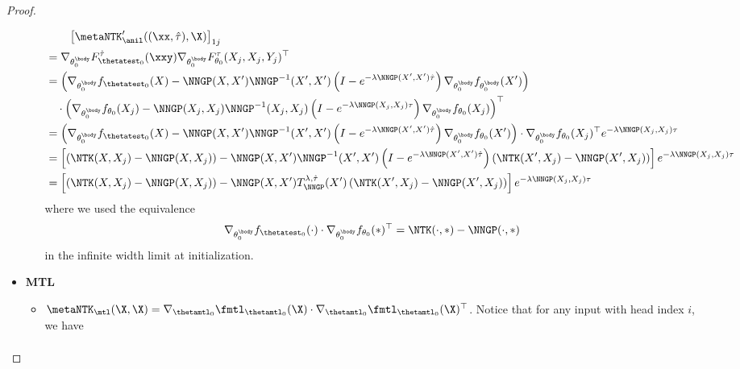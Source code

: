 \documentclass{article}
\begin{document}
\begin{proof}
\begin{itemize}[leftmargin=*,align=left,noitemsep,nolistsep]
\begin{itemize}[leftmargin=*,align=left,noitemsep,nolistsep]
        \begin{align}
            &\qquad\left[\metaNTK_\anil'((\xx,\hat\tau),\X)\right]_{1j}\nonumber \\
            &=  \nabla_{\theta_0^\body}F^{\hat\tau}_{\thetatest_0}(\xxy) \nabla_{\theta_0^\body}F^{\tau}_{\theta_0}(X_j,X_j,Y_j)^\top\nonumber\\
            &=\left(\nabla_{\theta_0^\body} f_{\thetatest_0}(X) - \NNGP(X,X')\NNGP^{-1}(X',X')\left(I - e^{-\lambda \NNGP(X',X')\hat\tau}\right) \nabla_{\theta_0^\body} f_{\theta_0^\body}(X') \right) \nonumber\\
            &\quad\cdot \left(\nabla_{\theta_0^\body} f_{\theta_0}(X_j) - \NNGP(X_j,X_j)\NNGP^{-1}(X_j,X_j)\left(I - e^{-\lambda \NNGP(X_j,X_j)\tau}\right) \nabla_{\theta_0^\body} f_{\theta_0}(X_j) \right)^\top\nonumber\\
            &= \left(\nabla_{\theta_0^\body} f_{\thetatest_0}(X) - \NNGP(X,X')\NNGP^{-1}(X',X')\left(I - e^{-\lambda \NNGP(X',X')\hat\tau}\right) \nabla_{\theta_0^\body} f_{\theta_0}(X') \right) \cdot \nabla_{\theta_0^\body} f_{\theta_0}(X_j)^\top e^{-\lambda \NNGP(X_j,X_j)\tau} \nonumber \\
            &= \left[\left(\NTK(X,X_j) -\NNGP(X,X_j)\right)- \NNGP(X,X')\NNGP^{-1}(X',X')\left(I - e^{-\lambda \NNGP(X',X')\hat\tau}\right)\left(\NTK(X',X_j) - \NNGP(X',X_j)\right)\right] e^{-\lambda \NNGP(X_j,X_j)\tau} \nonumber \\
&= \left[\left(\NTK(X,X_j) -\NNGP(X,X_j)\right)- \NNGP(X,X')T^{\lambda,\hat\tau}_{\NNGP}(X')\left(\NTK(X',X_j) - \NNGP(X',X_j)\right)\right] e^{-\lambda \NNGP(X_j,X_j)\tau}
            \label{eq:anil-kernel-test:supp}
        \end{align}
        where we used the equivalence 
        \begin{align}
            \nabla_{\theta_0^\body} f_{\thetatest_0}(\cdot) \cdot \nabla_{\theta_0^\body} f_{\theta_0}(\ast)^\top = \NTK(\cdot,\ast) - \NNGP(\cdot,\ast)
        \end{align}
        in the infinite width limit at initialization.
\end{itemize}
    \item \textbf{MTL}
    \begin{itemize}[leftmargin=*,align=left,noitemsep,nolistsep]
        \item $\metaNTK_\mtl(\X,\X)=\nabla_{\thetamtl_0} \fmtl_{\thetamtl_0}(\X) \cdot  \nabla_{\thetamtl_0} \fmtl_{\thetamtl_0}(\X)^\top$. Notice that for any input with head index $i$, we have
        \begin{align*}

\end{align*}
\end{itemize}
\end{itemize}
\end{proof}
\end{document}
